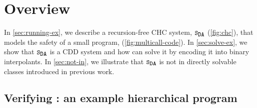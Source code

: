 \section{Overview}
\label{sec:overview}

In \autoref{sec:running-ex}, we describe a recursion-free CHC system,
$\mcchc$ (\autoref{fig:chc}), that models the safety of a small program,
 (\autoref{fig:multicall-code}).
%
In \autoref{sec:solve-ex}, we show that $\mcchc$ is a CDD system and
how \sys can solve it by encoding it into binary interpolants.
%
In \autoref{sec:not-in}, we illustrate that $\mcchc$ is not in
directly solvable classes introduced in previous work.
%

\subsection{Verifying : an example hierarchical program}
\label{sec:running-ex}

